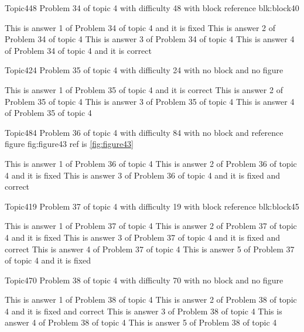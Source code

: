 \documentclass[master]{exam}
\begin{document}
\begin{problem}[requires=blk:block40]{Topic4}{48}
	Problem 34 of topic 4 with difficulty 48 with block reference blk:block40
	\begin{answers}
		\answer[fixed] This is answer 1 of Problem 34 of topic 4 and it is fixed
		\answer This is answer 2 of Problem 34 of topic 4 
		\answer This is answer 3 of Problem 34 of topic 4 
		\answer[correct] This is answer 4 of Problem 34 of topic 4 and it is correct
	\end{answers}
\end{problem}

\begin{problem}{Topic4}{24}
	Problem 35 of topic 4 with difficulty 24 with no block and no figure
	\begin{answers}
		\answer[correct] This is answer 1 of Problem 35 of topic 4 and it is correct
		\answer This is answer 2 of Problem 35 of topic 4 
		\answer This is answer 3 of Problem 35 of topic 4 
		\answer This is answer 4 of Problem 35 of topic 4 
	\end{answers}
\end{problem}

\begin{problem}{Topic4}{84}
	Problem 36 of topic 4 with difficulty 84 with no block and reference figure fig:figure43 ref is \ref{fig:figure43}
	\begin{answers}
		\answer This is answer 1 of Problem 36 of topic 4 
		\answer[fixed] This is answer 2 of Problem 36 of topic 4 and it is fixed
		 This is answer 3 of Problem 36 of topic 4 and it is fixed and correct
	\end{answers}
\end{problem}

\begin{problem}[requires=blk:block45]{Topic4}{19}
	Problem 37 of topic 4 with difficulty 19 with block reference blk:block45
	\begin{answers}
		\answer This is answer 1 of Problem 37 of topic 4 
		\answer[fixed] This is answer 2 of Problem 37 of topic 4 and it is fixed
		 This is answer 3 of Problem 37 of topic 4 and it is fixed and correct
		\answer This is answer 4 of Problem 37 of topic 4 
		\answer[fixed] This is answer 5 of Problem 37 of topic 4 and it is fixed
	\end{answers}
\end{problem}

\begin{problem}{Topic4}{70}
	Problem 38 of topic 4 with difficulty 70 with no block and no figure
	\begin{answers}
		\answer This is answer 1 of Problem 38 of topic 4 
		 This is answer 2 of Problem 38 of topic 4 and it is fixed and correct
		\answer This is answer 3 of Problem 38 of topic 4 
		\answer This is answer 4 of Problem 38 of topic 4 
		\answer This is answer 5 of Problem 38 of topic 4 
	\end{answers}
\end{problem}
\end{document}
